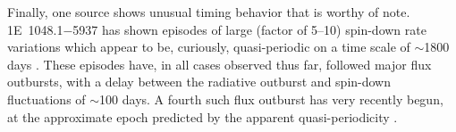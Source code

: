 
Finally, one source shows unusual timing behavior that is worthy of note.
1E~1048.1$-$5937 has shown episodes of large (factor of 5--10) spin-down rate variations which appear to be,
curiously, quasi-periodic on a time scale of $\sim$1800 days \citep{akn+15}.  These episodes have, in all cases
observed thus far, followed major flux outbursts, with a delay between the radiative outburst and spin-down fluctuations
of $\sim$100 days.  
A fourth such flux outburst has very recently begun, at the approximate epoch
predicted by the apparent quasi-periodicity \citep{atsk16}. 




